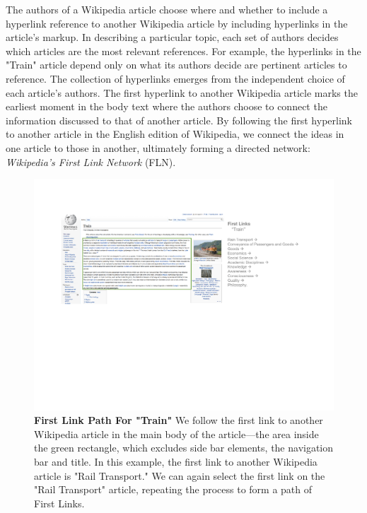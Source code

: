 \documentclass[pre,twocolumn,twoside,superscriptaddress,floatfix, aps, 10pt]{revtex4-1}
\begin{document}
The authors of a Wikipedia article choose where and whether to include a 
hyperlink reference to another Wikipedia article
by including hyperlinks in the article's markup.
In describing a particular topic, each set of authors decides which articles are the most
relevant references.
For example, the hyperlinks in the "Train" article depend only on what its authors 
decide are pertinent articles to reference.
The collection of hyperlinks emerges from the independent choice of each article's authors. 
The first hyperlink to another Wikipedia article marks the earliest moment in the body text where the authors
choose to connect the information discussed to that of another article.
By following the first hyperlink to another article in the English edition of
Wikipedia, we connect the ideas in one article to those in another, ultimately forming a directed network: 
{\it Wikipedia's First Link Network} (FLN).

\begin{figure}[tp!]
  \centering	
  \includegraphics[width=\textwidth]{graphics/Train.pdf}  
  \caption{
    \textbf{First Link Path For "Train"}
    We follow the first link to another Wikipedia article
    in the main body of the article---the area
    inside the green rectangle, which excludes 
    side bar elements, the navigation bar and title. 
    In this example, the first link to another Wikipedia article is "Rail Transport." 
    We can again select the first link on the "Rail Transport"
    article, repeating the process to 
    form a path of First Links.
  }
  \label{fig:Train First Links}
\end{figure}
\end{document}
